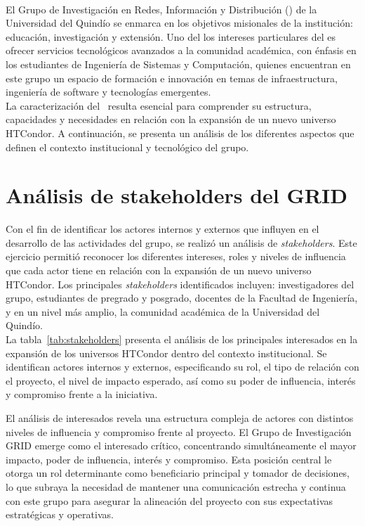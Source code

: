 \label{cap:caracterizacionGRID}
\mbox{}\\
\noindent
El Grupo de Investigación en Redes, Información y Distribución (\GRID) de la Universidad del Quindío se enmarca en los objetivos misionales de la institución: educación, investigación y extensión. Uno del los intereses particulares del \GRID es ofrecer servicios tecnológicos avanzados a la comunidad académica, con énfasis en los estudiantes de Ingeniería de Sistemas y Computación, quienes encuentran en este grupo un espacio de formación e innovación en temas de infraestructura, ingeniería de software y tecnologías emergentes.\\
La caracterización del \GRID\ resulta esencial para comprender su estructura, capacidades y necesidades en relación con la expansión de un nuevo universo HTCondor. A continuación, se presenta un análisis de los diferentes aspectos que definen el contexto institucional y tecnológico del grupo.

\section{Análisis de stakeholders del GRID}
\noindent
Con el fin de identificar los actores internos y externos que influyen en el desarrollo de las actividades del grupo, se realizó un análisis de \textit{stakeholders}. Este ejercicio permitió reconocer los diferentes intereses, roles y niveles de influencia que cada actor tiene en relación con la expansión de un nuevo universo HTCondor. Los principales \textit{stakeholders} identificados incluyen: investigadores del grupo, estudiantes de pregrado y posgrado, docentes de la Facultad de Ingeniería, y en un nivel más amplio, la comunidad académica de la Universidad del Quindío.
\\
\noindent
La tabla~\ref{tab:stakeholders} presenta el análisis de los principales interesados en la expansión de los universos HTCondor dentro del contexto institucional. Se identifican actores internos y externos, especificando su rol, el tipo de relación con el proyecto, el nivel de impacto esperado, así como su poder de influencia, interés y compromiso frente a la iniciativa.

El análisis de interesados revela una estructura compleja de actores con distintos niveles de influencia y compromiso frente al proyecto. El Grupo de Investigación GRID emerge como el interesado crítico, concentrando simultáneamente el mayor impacto, poder de influencia, interés y compromiso. Esta posición central le otorga un rol determinante como beneficiario principal y tomador de decisiones, lo que subraya la necesidad de mantener una comunicación estrecha y continua con este grupo para asegurar la alineación del proyecto con sus expectativas estratégicas y operativas.

